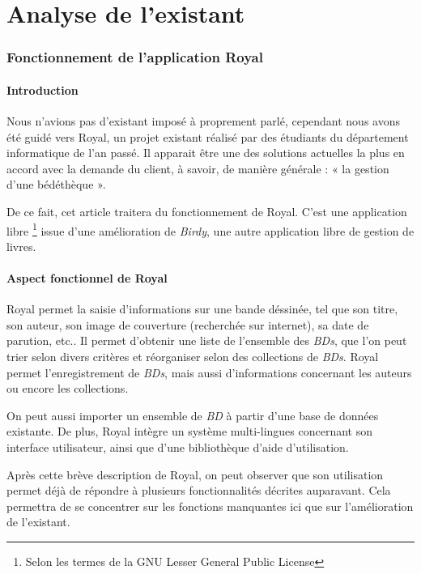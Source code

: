\part{Analyse de l'existant}


\section{Fonctionnement de l'application Royal}

\subsection{Introduction}
Nous n'avions pas d'existant imposé à proprement parlé, cependant nous avons été guidé vers Royal, un projet existant réalisé par des étudiants du département informatique de l'an passé.
Il apparait être une des solutions actuelles la plus en accord avec la demande du client, à savoir, de manière générale : « la gestion d'une bédéthèque ».

De ce fait, cet article traitera du fonctionnement de Royal.
C'est une application 
libre \footnote{Selon les termes de la GNU Lesser General Public License}
issue d'une amélioration de \emph{Birdy}, une autre application libre de gestion de livres.

\subsection{Aspect fonctionnel de Royal}
Royal permet la saisie d'informations sur une bande déssinée, tel que son titre, son auteur, son image de couverture (recherchée sur internet), sa date de parution, etc..
Il permet d'obtenir une liste de l'ensemble des \emph{BDs}, que l'on peut trier selon divers critères et réorganiser selon des collections de \emph{BDs}.
Royal permet l'enregistrement de \emph{BDs}, mais aussi d'informations concernant les auteurs ou encore les collections.

On peut aussi importer un ensemble de \emph{BD} à partir d'une base de données existante.
De plus, Royal intègre un système multi-lingues concernant son interface utilisateur, ainsi que d'une bibliothèque d'aide d'utilisation.

Après cette brève description de Royal, on peut observer que son utilisation permet déjà de répondre à plusieurs fonctionnalités décrites auparavant. Cela permettra de se concentrer sur les fonctions manquantes ici que sur l'amélioration de l'existant.

